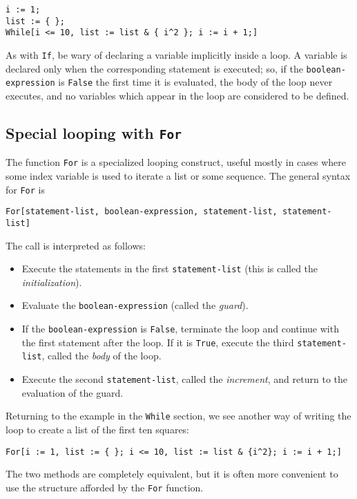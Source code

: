 \begin{verbatim}
i := 1;
list := { };
While[i <= 10, list := list & { i^2 }; i := i + 1;]
\end{verbatim}

As with \verb+If+, be wary of declaring a variable implicitly inside a
loop.  A variable is declared only when the corresponding statement is
executed; so, if the \verb+boolean-expression+ is \verb+False+ the
first time it is evaluated, the body of the loop never executes, and
no variables which appear in the loop are considered to be defined.

\subsection{Special looping with {\tt For}}

The function \verb+For+ is a specialized looping construct, useful
mostly in cases where some index variable is used to iterate a list or
some sequence.  The general syntax for \verb+For+ is

\begin{verbatim}
For[statement-list, boolean-expression, statement-list, statement-list]
\end{verbatim}

\noindent The call is interpreted as follows:
\begin{itemize}
\item Execute the statements in the first \verb+statement-list+ (this
is called the {\em initialization}).
\item Evaluate the \verb+boolean-expression+ (called the {\em guard}).
\item If the \verb+boolean-expression+ is \verb+False+, terminate the
loop and continue with the first statement after the loop.  If it is
\verb+True+, execute the third \verb+statement-list+, called the {\em
body} of the loop.
\item Execute the second \verb+statement-list+, called the {\em
increment}, and return to the evaluation of the guard.
\end{itemize}

Returning to the example in the \verb+While+ section, we see another
way of writing the loop to create a list of the first ten squares:

\begin{verbatim}
For[i := 1, list := { }; i <= 10, list := list & {i^2}; i := i + 1;]
\end{verbatim}

\noindent The two methods are completely equivalent, but it is often
more convenient to use the structure afforded by the \verb+For+
function.

